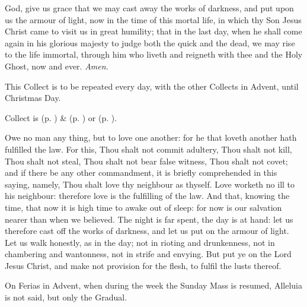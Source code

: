 \collect\label{AdventICollect}
 God, give us grace that we may cast away the works of darkness, and put upon us the armour of light, now in the time of this mortal life, in which thy Son Jesus Christ came to visit us in great humility; that in the last day, when he shall come again in his glorious majesty to judge both the quick and the dead, we may rise to the life immortal, through him who liveth and reigneth with thee and the Holy Ghost, now and ever. \textit{Amen.}
\begin{rubric}
    This Collect is to be repeated every day, with the other Collects in Advent, until Christmas Day.
\end{rubric}
\begin{rubric}
     Collect is  (p. \pageref{SPMaryInAdvent}) \&   (p. \pageref{SPAgainst}) or  (p. \pageref{SPChiefBishop}).
\end{rubric}
 Owe no man any thing, but to love one another: for he that loveth another hath fulfilled the law. For this, Thou shalt not commit adultery, Thou shalt not kill, Thou shalt not steal, Thou shalt not bear false witness, Thou shalt not covet; and if there be any other commandment, it is briefly comprehended in this saying, namely, Thou shalt love thy neighbour as thyself. Love worketh no ill to his neighbour: therefore love is the fulfilling of the law. And that, knowing the time, that now it is high time to awake out of sleep: for now is our salvation nearer than when we believed. The night is far spent, the day is at hand: let us therefore cast off the works of darkness, and let us put on the armour of light. Let us walk honestly, as in the day; not in rioting and drunkenness, not in chambering and wantonness, not in strife and envying. But put ye on the Lord Jesus Christ, and make not provision for the flesh, to fulfil the lusts thereof.
\begin{rubric}
    On Ferias in Advent, when during the week the Sunday Mass is resumed, Alleluia is not said, but only the Gradual.
\end{rubric}

